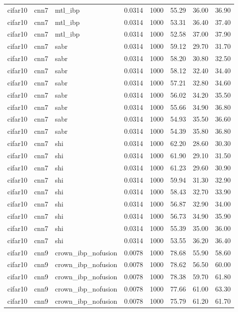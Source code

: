 \begin{tabular}{llllllll}
cifar10 & cnn7 & mtl\_ibp & 0.0314 & 1000 & 55.29 & 36.00 & 36.90 \\
cifar10 & cnn7 & mtl\_ibp & 0.0314 & 1000 & 53.31 & 36.40 & 37.40 \\
cifar10 & cnn7 & mtl\_ibp & 0.0314 & 1000 & 52.58 & 37.00 & 37.90 \\
cifar10 & cnn7 & sabr & 0.0314 & 1000 & 59.12 & 29.70 & 31.70 \\
cifar10 & cnn7 & sabr & 0.0314 & 1000 & 58.20 & 30.80 & 32.50 \\
cifar10 & cnn7 & sabr & 0.0314 & 1000 & 58.12 & 32.40 & 34.40 \\
cifar10 & cnn7 & sabr & 0.0314 & 1000 & 57.21 & 32.80 & 34.60 \\
cifar10 & cnn7 & sabr & 0.0314 & 1000 & 56.02 & 34.20 & 35.50 \\
cifar10 & cnn7 & sabr & 0.0314 & 1000 & 55.66 & 34.90 & 36.80 \\
cifar10 & cnn7 & sabr & 0.0314 & 1000 & 54.93 & 35.50 & 36.60 \\
cifar10 & cnn7 & sabr & 0.0314 & 1000 & 54.39 & 35.80 & 36.80 \\
cifar10 & cnn7 & shi & 0.0314 & 1000 & 62.20 & 28.60 & 30.30 \\
cifar10 & cnn7 & shi & 0.0314 & 1000 & 61.90 & 29.10 & 31.50 \\
cifar10 & cnn7 & shi & 0.0314 & 1000 & 61.23 & 29.60 & 30.90 \\
cifar10 & cnn7 & shi & 0.0314 & 1000 & 59.94 & 31.30 & 32.90 \\
cifar10 & cnn7 & shi & 0.0314 & 1000 & 58.43 & 32.70 & 33.90 \\
cifar10 & cnn7 & shi & 0.0314 & 1000 & 56.87 & 32.90 & 34.00 \\
cifar10 & cnn7 & shi & 0.0314 & 1000 & 56.73 & 34.90 & 35.90 \\
cifar10 & cnn7 & shi & 0.0314 & 1000 & 55.39 & 35.00 & 36.00 \\
cifar10 & cnn7 & shi & 0.0314 & 1000 & 53.55 & 36.20 & 36.40 \\
cifar10 & cnn9 & crown\_ibp\_nofusion & 0.0078 & 1000 & 78.68 & 55.90 & 58.60 \\
cifar10 & cnn9 & crown\_ibp\_nofusion & 0.0078 & 1000 & 78.62 & 56.50 & 60.00 \\
cifar10 & cnn9 & crown\_ibp\_nofusion & 0.0078 & 1000 & 78.38 & 59.70 & 61.80 \\
cifar10 & cnn9 & crown\_ibp\_nofusion & 0.0078 & 1000 & 77.66 & 61.00 & 63.30 \\
cifar10 & cnn9 & crown\_ibp\_nofusion & 0.0078 & 1000 & 75.79 & 61.20 & 61.70 \\

\end{tabular}
